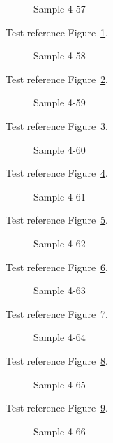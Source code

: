 \begin{figure}[tbhp]
\caption{Sample 4-57}
\label{fig:sample-4-57}
\end{figure}

Test reference Figure~\ref{fig:sample-4-57}.

\begin{figure}[tbhp]
\caption{Sample 4-58}
\label{fig:sample-4-58}
\end{figure}

Test reference Figure~\ref{fig:sample-4-58}.

\begin{figure}[tbhp]
\caption{Sample 4-59}
\label{fig:sample-4-59}
\end{figure}

Test reference Figure~\ref{fig:sample-4-59}.

\begin{figure}[tbhp]
\caption{Sample 4-60}
\label{fig:sample-4-60}
\end{figure}

Test reference Figure~\ref{fig:sample-4-60}.

\begin{figure}[tbhp]
\caption{Sample 4-61}
\label{fig:sample-4-61}
\end{figure}

Test reference Figure~\ref{fig:sample-4-61}.

\begin{figure}[tbhp]
\caption{Sample 4-62}
\label{fig:sample-4-62}
\end{figure}

Test reference Figure~\ref{fig:sample-4-62}.

\begin{figure}[tbhp]
\caption{Sample 4-63}
\label{fig:sample-4-63}
\end{figure}

Test reference Figure~\ref{fig:sample-4-63}.

\begin{figure}[tbhp]
\caption{Sample 4-64}
\label{fig:sample-4-64}
\end{figure}

Test reference Figure~\ref{fig:sample-4-64}.

\begin{figure}[tbhp]
\caption{Sample 4-65}
\label{fig:sample-4-65}
\end{figure}

Test reference Figure~\ref{fig:sample-4-65}.

\begin{figure}[tbhp]
\caption{Sample 4-66}
\label{fig:sample-4-66}
\end{figure}

